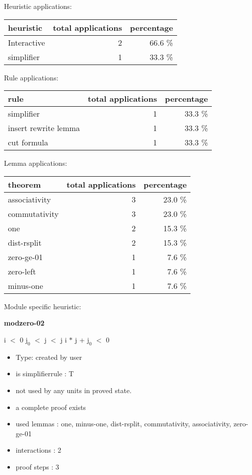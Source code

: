 \documentclass[a4paper]{article}
\begin{document}
\medskip


Heuristic applications:

\begin{supertabular}{l|r|r}
heuristic	& total applications & percentage \\ \hline
Interactive & 2 & 66.6 \% \\
simplifier & 1 & 33.3 \% \\

\end{supertabular}

Rule applications:

\begin{supertabular}{l|r|r}
rule	        & total applications & percentage \\ \hline
simplifier & 1 & 33.3 \% \\
insert rewrite lemma & 1 & 33.3 \% \\
cut formula & 1 & 33.3 \% \\

\end{supertabular}

Lemma applications:

\begin{supertabular}{l|r|r}
theorem	        & total applications & percentage \\ \hline
associativity & 3 & 23.0 \% \\
commutativity & 3 & 23.0 \% \\
one & 2 & 15.3 \% \\
dist-rsplit & 2 & 15.3 \% \\
zero-ge-01 & 1 & 7.6 \% \\
zero-left & 1 & 7.6 \% \\
minus-one & 1 & 7.6 \% \\

\end{supertabular}

Module specific heuristic:

\pagebreak

{\LARGE\bf modzero-02}\label{lemma-modzero-02}

\medskip

 \Fol i $<$ 0 \And $\mbox{j}_{0}$ $<$ j  $<$ j \Imp i $*$ j + $\mbox{j}_{0}$ $<$ 0

\begin{itemize}

\item Type: created by user

\item is simplifierrule : T
\item not used by any units in proved state.
\item       a complete proof exists
\item       used lemmas  : one, minus-one, dist-rsplit, commutativity, associativity, zero-ge-01
\item       interactions : 2
\item       proof steps  : 3
\end{itemize}
\end{document}
